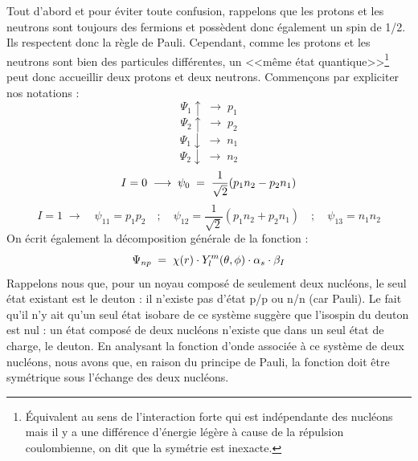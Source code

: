 Tout d'abord et pour éviter toute confusion, rappelons que les protons et les neutrons sont toujours des fermions et possèdent donc également un spin de 1/2. Ils respectent donc la règle de Pauli. Cependant, comme les protons et les neutrons sont bien des particules différentes, un <<même état quantique>>\footnote{Équivalent au sens de l'interaction forte qui est indépendante des nucléons mais il y a une différence d'énergie légère à cause de la répulsion coulombienne, on dit que la symétrie est inexacte.} peut donc accueillir deux protons et deux neutrons. Commençons par expliciter nos notations :
\begin{equation*}
    \Psi_1\uparrow \;\longrightarrow\; p_1
\end{equation*}
\begin{equation*}
    \Psi_2\uparrow \;\longrightarrow\; p_2
\end{equation*}
\begin{equation*}
    \Psi_1\downarrow\;\longrightarrow\; n_1
\end{equation*}
\begin{equation*}
    \Psi_2\downarrow\;\longrightarrow\; n_2
\end{equation*}
\begin{equation*}
    I = 0 \; \longrightarrow \; \psi_0 \; = \; \dfrac{1}{\sqrt{2}}(p_1n_2 - p_2n_1)
\end{equation*}
\begin{equation*}
    I = 1 \; \longrightarrow \quad \psi_{11} = p_1p_2 \quad;\quad \psi_{12} = \dfrac{1}{\sqrt{2}}(p_1n_2 + p_2n_1) \quad;\quad \psi_{13} = n_1n_2
\end{equation*}
On écrit également la décomposition générale de la fonction :
\begin{equation*}
    \Psi_{np} \; = \; \chi(r) \cdot Y_l^m(\theta,\phi) \cdot \alpha_s \cdot \beta_I
\end{equation*}
Rappelons nous que, pour un noyau composé de seulement deux nucléons, le seul état existant est le deuton : il n'existe pas d'état p/p ou n/n (car Pauli). Le fait qu'il n'y ait qu'un seul état isobare de ce système suggère que l'isospin du deuton est nul : un état composé de deux nucléons n'existe que dans un seul état de charge, le deuton. En analysant la fonction d'onde associée à ce système de deux nucléons, nous avons que, en raison du principe de Pauli, la fonction doit être symétrique sous l'échange des deux nucléons.\\


